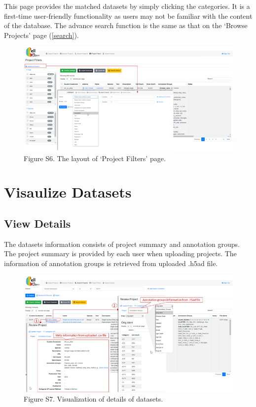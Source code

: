 \documentclass[
]{book}
\begin{document}
This page provides the matched datasets by simply clicking the categories. It is a first-time user-friendly functionality as users may not be familiar with the content of the database. The advance search function is the same as that on the `Browse Projects' page (\ref{search}).

\begin{figure}
\centering
\includegraphics{figures/S8.png}
\caption{Figure S6. The layout of `Project Filters' page.}
\end{figure}

\hypertarget{visaulize-datasets}{%
\section{Visaulize Datasets}\label{visaulize-datasets}}

\hypertarget{view-details}{%
\subsection{View Details}\label{view-details}}

The datasets information consists of project summary and annotation groups. The project summary is provided by each user when uploading projects. The information of annotation groups is retrieved from uploaded .h5ad file.

\begin{figure}
\centering
\includegraphics{figures/S9.png}
\caption{Figure S7. Visualization of details of datasets.}
\end{figure}
\end{document}
